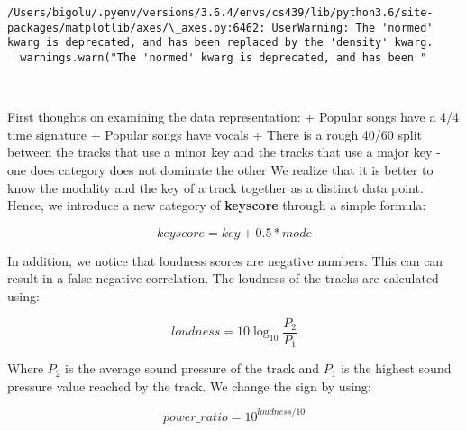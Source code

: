 \documentclass[11pt]{article}
\begin{document}
    \begin{Verbatim}[commandchars=\\\{\}]
/Users/bigolu/.pyenv/versions/3.6.4/envs/cs439/lib/python3.6/site-packages/matplotlib/axes/\_axes.py:6462: UserWarning: The 'normed' kwarg is deprecated, and has been replaced by the 'density' kwarg.
  warnings.warn("The 'normed' kwarg is deprecated, and has been "

    \end{Verbatim}

    \begin{center}
    \end{center}
    { \hspace*{\fill} \\}
    
    First thoughts on examining the data representation: + Popular songs
have a 4/4 time signature + Popular songs have vocals + There is a rough
40/60 split between the tracks that use a minor key and the tracks that
use a major key - one does category does not dominate the other We
realize that it is better to know the modality and the key of a track
together as a distinct data point. Hence, we introduce a new category of
\textbf{keyscore} through a simple formula:

\[keyscore = key + 0.5*mode\]

In addition, we notice that loudness scores are negative numbers. This
can can result in a false negative correlation. The loudness of the
tracks are calculated using:

\[loudness = 10\log_{10}{\frac{P_2}{P_1}}\]

Where \(P_2\) is the average sound pressure of the track and \(P_1\) is
the highest sound pressure value reached by the track. We change the
sign by using:

\[power\_ratio = 10^{loudness/10}\]
\end{document}
